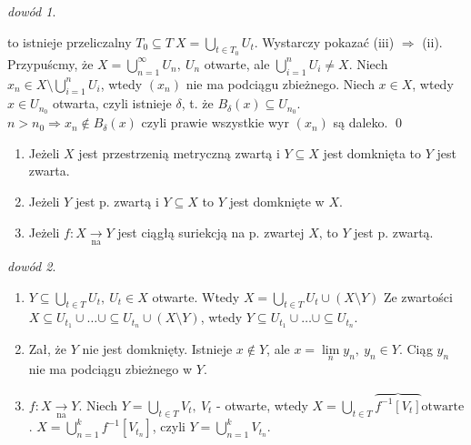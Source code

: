 \documentclass[twoside,10pt]{article}
\theoremstyle{definition}
\theoremstyle{definition}
\theoremstyle{definition}
\theoremstyle{definition}
\theoremstyle{remark}
\newtheorem*{dd}{dowód}
\theoremstyle{definition}
\theoremstyle{definition}
\theoremstyle{definition}
\theoremstyle{definition}
\theoremstyle{definition}
\theoremstyle{definition}
\begin{document}
\begin{dd}
\begin{itemize}
            to istnieje przeliczalny $T_0 \subseteq T \  X = \bigcup\limits_{t \in T_0} U_t$. Wystarczy pokazać (iii) $\Rightarrow$ (ii). \\ 
            Przypuścmy, że $X = \bigcup\limits_{n=1}^\infty U_n, \ U_n$ otwarte, ale $\bigcup\limits_{i=1}^n U_i \neq X$. Niech $x_n \in X \setminus \bigcup\limits_{i=1}^n U_i$,
            wtedy $(x_n)$ nie ma podciągu zbieżnego. Niech $x \in X$, wtedy $x \in U_{n_0}$ otwarta, czyli istnieje $\delta$, t. że $B_\delta(x) \subseteq U_{n_0}$. \\ 
            $n > n_0 \Rightarrow x_n \notin B_\delta(x)$ czyli prawie wszystkie wyr $(x_n)$ są daleko. 
            \hfill \qed
    \end{itemize} 
\end{dd} 

\begin{tw} \hfill 
    \begin{enumerate}[(1)]
        \item Jeżeli $X$ jest przestrzenią metryczną zwartą i $Y \subseteq X$ jest domknięta to $Y$ jest zwarta.
        \item Jeżeli $Y$ jest p. zwartą i $Y \subseteq X$ to $Y$ jest domknięte w $X$. 
        \item Jeżeli $f: X \underset{\text{na}}{\rightarrow} Y$ jest ciągłą suriekcją na p. zwartej $X$, to $Y$ jest p. zwartą.
    \end{enumerate} 
\end{tw} 
\begin{dd} \hfill  
    \begin{enumerate}[(1)] 
        \item $Y \subseteq \bigcup\limits_{t \in T} U_t,\  U_t \in X$ otwarte. Wtedy $X = \bigcup\limits_{t \in T} U_t \cup ( X \setminus Y)$
        Ze zwartości $X \subseteq U_{t_1} \cup \ldots \cup \subseteq U_{t_n} \cup (X \setminus Y)$, wtedy $Y \subseteq U_{t_1} \cup \ldots \cup \subseteq U_{t_n}$. 
        \item Zał, że $Y$ nie jest domknięty. Istnieje $x \notin Y$, ale $ x = \lim\limits_n y_n, \ y_n \in Y$. Ciąg $y_n$ nie ma podciągu zbieżnego w $Y$. \lightning
        \item $f: X \underset{\text{na}}{\rightarrow} Y$. Niech $Y = \bigcup\limits_{t \in T} V_t, \ V_t$ - otwarte, wtedy $X = \bigcup\limits_{t \in T} \overbrace{f^{-1}[V_t]}{\text{otwarte}}$.
        $X = \bigcup\limits_{n=1}^k f^{-1}[V_{t_n}]$, czyli $Y = \bigcup\limits_{n=1}^k V_{t_n}$.
    \end{enumerate}
\end{dd}
\end{document}
